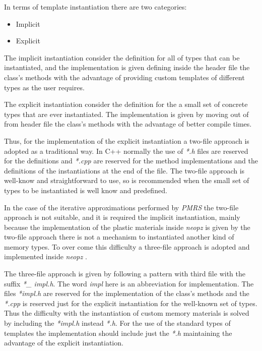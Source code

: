 \documentclass[a4paper]{article}
\newcommand{\PMRS}{\textit{PMRS }}
\newcommand{\neopz}{\textit{neopz }}
\begin{document}
In terms of template instantiation there are two categories:

\begin{itemize}
	\item Implicit
	\item Explicit	
\end{itemize}

The implicit instantiation  consider the definition for all of types that can be instantiated, and the implementation is given defining inside the header file the class's methods with the advantage of providing custom templates of different types as the user requires.

The explicit instantiation  consider the definition for the a small set of concrete types that are ever instantiated. The implementation is given by moving out of from header file the class's methods with the advantage of better compile times.

Thus, for the implementation of the explicit instantiation a two-file approach is adopted as a traditional way. In C++ normally the use of \textit{*.h} files are reserved for the definitions and  \textit{*.cpp} are reserved for the method implementations and the definitions of the instantiations at the end of the file. The two-file approach is well-know and straightforward to use, so is recommended when the small set of types to be instantiated is well know and predefined.

In the case of the iterative approximations performed by \PMRS the two-file approach is not suitable, and it is required the implicit instantiation, mainly because the implementation of the plastic materials inside \neopz is given by the two-file approach there is not a mechanism to instantiated another kind of memory types. To over come this difficulty a three-file approach is adopted and implemented inside \neopz.

The three-file approach is given by following a pattern with third file with the suffix \textit{*\_ impl.h}. The word \textit{impl} here is an abbreviation for implementation. The files \textit{*impl.h} are reserved for the implementation of the class's methods and the \textit{*.cpp} is reserved just for the explicit instantiation for the well-known set of types. Thus the difficulty with the instantiation of custom memory materials is solved by including the  \textit{*impl.h} instead \textit{*.h}. For the use of the standard types of templates the implementation should include just the \textit{*.h} maintaining the advantage of the explicit instantiation.
\end{document}
